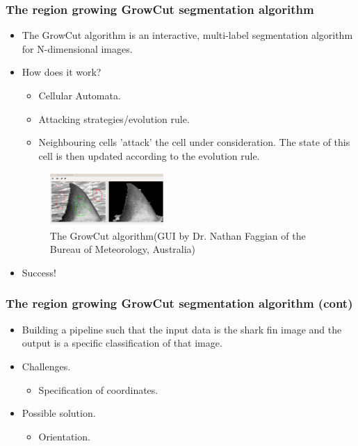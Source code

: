 \documentclass{beamer}
\newcommand{\myitem}{\item[$-$]}
\begin{document}
\begin{frame}
\frametitle{The region growing GrowCut segmentation algorithm}
\begin{itemize}
\item The GrowCut\cite{alg} algorithm is an interactive, multi-label segmentation algorithm for N-dimensional images.
\item How does it work? 
\begin{itemize}
\myitem Cellular Automata\cite{cellularoutomata}.
\myitem Attacking strategies/evolution rule.
\myitem Neighbouring cells 'attack' the cell under consideration.  The state of this cell is then updated
according to the evolution rule.
\end{itemize}
\begin{figure}
\centering
\includegraphics[width=1.7in, height=0.8in]{haaim.png}
\caption{The GrowCut algorithm(GUI by Dr. Nathan Faggian of the Bureau of Meteorology, Australia)}
\end{figure}
\item Success!
\end{itemize}
\end{frame}

\begin{frame}
\frametitle{The region growing GrowCut segmentation algorithm (cont)}
\begin{itemize}
\item Building a pipeline such that the input data is the shark fin image and the output is a specific
classification of that image.
\item Challenges.
\begin{itemize}
\myitem Specification of coordinates.
\end{itemize}
\item Possible solution.
\begin{itemize}
\myitem Orientation.
\end{itemize}
\end{itemize}
\end{frame}
\end{document}
